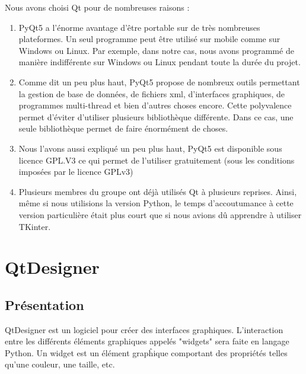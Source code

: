 \documentclass[12pt]{report}    %
\begin{document}
Nous avons choisi Qt pour de nombreuses raisons :
\begin{enumerate}
    \item \textcolor{red}{}\newline PyQt5 a l'énorme avantage d'être portable sur de très nombreuses plateformes. Un seul programme peut être utilisé sur mobile comme sur Windows ou Linux.\newline
    Par exemple, dans notre cas, nous avons programmé de manière indifférente sur Windows ou Linux pendant toute la durée du projet.
    
    \item \textcolor{red}{}\newline Comme dit un peu plus haut, PyQt5 propose de nombreux outils permettant la gestion de base de données, de fichiers xml, d'interfaces graphiques, de programmes multi-thread et bien d'autres choses encore. Cette polyvalence permet d'éviter d'utiliser plusieurs bibliothèque différente. Dans ce cas, une seule bibliothèque permet de faire énormément de choses.
    
    \item \textcolor{red}{}\newline Nous l'avons aussi expliqué un peu plus haut, PyQt5 est disponible sous licence GPL.V3 ce qui permet de l'utiliser gratuitement (sous les conditions imposées par le licence GPLv3)
    
    \item \textcolor{red}{}\newline Plusieurs membres du groupe ont déjà utilisés Qt à plusieurs reprises. Ainsi, même si nous utilisions la version Python, le temps d'accoutumance à cette version particulière était plus court que si nous avions dû apprendre à utiliser TKinter.
\end{enumerate}

\section{QtDesigner}

\subsection{Présentation}
QtDesigner est un logiciel pour créer des interfaces graphiques.\newline
L'interaction entre les différents éléments graphiques appelés "widgets" sera faite en langage Python. 
Un widget est un élément grapĥique comportant des propriétés telles qu'une couleur, une taille, etc. \newline \newline
\end{document}
